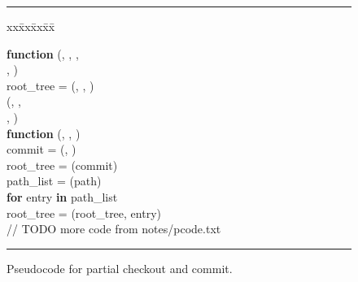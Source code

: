 \begin{figure}[htb]
\small
\rule{\linewidth}{.08em}

\begin{tabbing}
xx\=xx\=xx\=xx\=\kill

{\bf function} (, ,
, \\
\>\>\> , ) \\
\> root\_tree = (, ,
) \\
\> (, , \\
\>\>\> , ) \\ [2mm]

{\bf function}  (, , ) \\
\> commit = (, ) \\
\> root\_tree = (commit) \\
\> path\_list = (path) \\ %
\> {\bf for} entry {\bf in} path\_list \\
\>\> root\_tree = (root\_tree, entry) \\ [2mm]

// TODO more code from notes/pcode.txt

\end{tabbing}

\rule{\linewidth}{.08em}
\caption{Pseudocode for partial checkout and commit.}
\label{f:pcode-checkout}
\end{figure}

\endinput

\begin{algorithmic}
    \Function{checkout}{$\mathit{commit\_id}, \mathit{relative\_root\_path},
        \mathit{destination\_path}, \mathit{access\_control\_list}, \mathit{repo}$}
    \EndFunction
\end{algorithmic}

